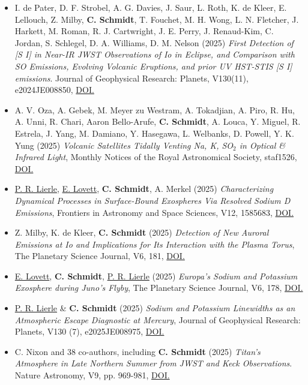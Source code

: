 \documentclass[12pt]{report}
\begin{document}
\begin{itemize}
  \item I. de Pater, D. F. Strobel, A. G. Davies, J. Saur, L. Roth, K. de Kleer, E. Lellouch, Z. Milby, \textbf{C. Schmidt}, T. Fouchet, M. H. Wong, L. N. Fletcher, J. Harkett, M. Roman, R. J. Cartwright, J. E. Perry, J. Renaud-Kim, C. Jordan, S. Schlegel, D. A. Williams, D. M. Nelson (2025) \textit{First Detection of [S I] in Near-IR JWST Observations of Io in Eclipse, and Comparison with SO Emissions, Evolving Volcanic Eruptions, and prior UV HST-STIS [S I] emissions}. Journal of Geophysical Research: Planets, V130(11), e2024JE008850, \href{https://doi.org/10.1029/2024JE008850}{DOI.} 
  \item A. V. Oza, A. Gebek, M. Meyer zu Westram, A. Tokadjian, A. Piro, R. Hu, A. Unni, R. Chari, Aaron Bello-Arufe, \textbf{C. Schmidt}, A. Louca, Y. Miguel, R. Estrela, J. Yang, M. Damiano, Y. Hasegawa, L. Welbanks, D. Powell, Y. K. Yung (2025) \textit{Volcanic Satellites Tidally Venting Na, K, SO$_2$ in Optical \& Infrared Light}, Monthly Notices of the Royal Astronomical Society, staf1526, \href{https://doi.org/10.1093/mnras/staf1526}{DOI.} 
  \item \underline{P. R. Lierle}, \underline{E. Lovett}, \textbf{C. Schmidt}, A. Merkel (2025) \textit{Characterizing Dynamical Processes in Surface-Bound Exospheres Via Resolved Sodium D Emissions}, Frontiers in Astronomy and Space Sciences, V12, 1585683, \href{https://doi.org/10.3389/fspas.2025.1585683}{DOI.} 
  \item Z. Milby, K. de Kleer, \textbf{C. Schmidt} (2025) \textit{Detection of New Auroral Emissions at Io and Implications for Its Interaction with the Plasma Torus}, The Planetary Science Journal, V6, 181, \href{https://doi.org/10.3847/PSJ/ade0b1}{DOI.} 
  \item \underline{E. Lovett}, \textbf{C. Schmidt}, \underline{P. R. Lierle} (2025) \textit{Europa’s Sodium and Potassium Exosphere during Juno’s Flyby}, The Planetary Science Journal, V6, 178, \href{https://doi.org/10.3847/PSJ/adeb52}{DOI.} 
  \item \underline{P. R. Lierle} \& \textbf{C. Schmidt} (2025) \textit{Sodium and Potassium Linewidths as an Atmospheric Escape Diagnostic at Mercury}, Journal of Geophysical Research: Planets, V130 (7), e2025JE008975, \href{https://doi.org/10.1029/2025JE008975}{DOI.}
  \item C. Nixon and 38 co-authors, including \textbf{C. Schmidt} (2025) \textit{Titan's Atmosphere in Late Northern Summer from JWST and Keck Observations}. Nature Astronomy, V9, pp. 969-981, \href{https://doi.org/10.1038/s41550-025-02537-3}{DOI.}

\end{itemize}
\end{document}
